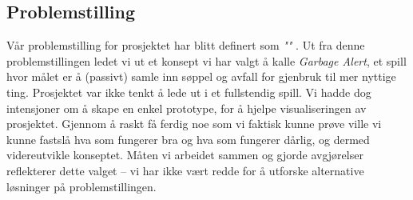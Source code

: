 	\subsection{Problemstilling}
	Vår problemstilling for prosjektet har blitt definert som
	\emph{""}
	. Ut fra denne problemstillingen ledet vi ut et konsept vi har valgt å kalle \emph{Garbage Alert}, et spill hvor målet er å (passivt) samle inn søppel og avfall for gjenbruk til mer nyttige ting. Prosjektet var ikke tenkt å lede ut i et fullstendig spill. Vi hadde dog intensjoner om å skape en enkel prototype, for å hjelpe visualiseringen av prosjektet. Gjennom å raskt få ferdig noe som vi faktisk kunne prøve ville vi kunne fastslå hva som fungerer bra og hva som fungerer dårlig, og dermed videreutvikle konseptet. Måten vi arbeidet sammen og gjorde avgjørelser reflekterer dette valget – vi har ikke vært redde for å utforske alternative løsninger på problemstillingen.